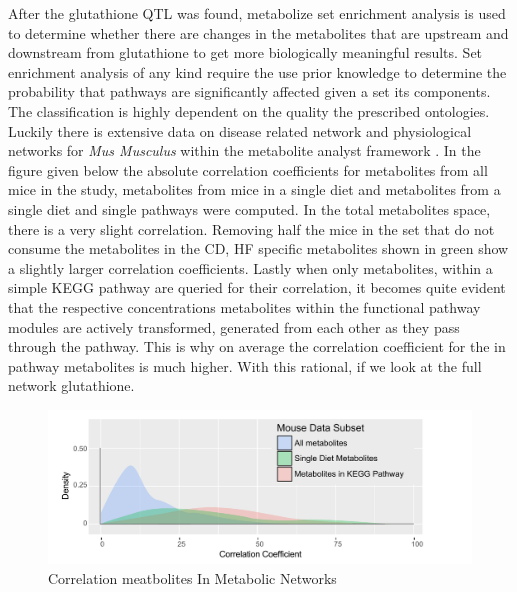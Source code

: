 \documentclass[a4paper,11pt,twoside]{book}
\begin{document}
	After the glutathione QTL was found, metabolize set enrichment analysis is used to determine whether there are changes in the metabolites that are upstream and downstream from glutathione to get more biologically meaningful results. Set enrichment analysis of any kind require the use prior knowledge to determine the probability that pathways are significantly affected given a set its components. The classification is highly dependent on the quality the prescribed ontologies. Luckily there is extensive data on disease related network and physiological networks for \textit{Mus Musculus} within the metabolite analyst framework \citep{Xia2016UsingAnalysis}. In the figure given below the absolute correlation coefficients for metabolites from all mice in the study, metabolites from mice in a single diet and metabolites from a single diet and single pathways were computed. In the total metabolites space, there is a very slight correlation. Removing half the mice in the set that do not consume the metabolites in the CD, HF specific metabolites shown in green show a slightly larger correlation coefficients. Lastly when only metabolites, within a simple KEGG pathway are queried for their correlation, it becomes quite evident that the respective concentrations metabolites within the functional pathway modules are actively transformed, generated from each other as they pass through the pathway. This is why on average the correlation coefficient for the in pathway metabolites is much higher. With this rational, if we look at the  full network glutathione.
	
	\begin{figure}[htb!]
		\centering
		\includegraphics[width=\linewidth]{3.Metabolomics/KEGG_Path_Correlations}
		\caption{Correlation meatbolites In Metabolic Networks}
		\label{fig:keggpathcorrelations}
	\end{figure}
	
\end{document}
